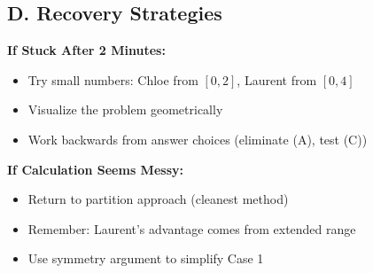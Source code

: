 \documentclass[]{article}
\begin{document}
\begin{solutionbox}
\subsection*{D. Recovery Strategies}

\textbf{If Stuck After 2 Minutes:}
\begin{itemize}[leftmargin=*]
    \item Try small numbers: Chloe from $[0,2]$, Laurent from $[0,4]$
    \item Visualize the problem geometrically
    \item Work backwards from answer choices (eliminate (A), test (C))
\end{itemize}

\textbf{If Calculation Seems Messy:}
\begin{itemize}[leftmargin=*]
    \item Return to partition approach (cleanest method)
    \item Remember: Laurent's advantage comes from extended range
    \item Use symmetry argument to simplify Case 1
\end{itemize}
\end{solutionbox}
\end{document}
